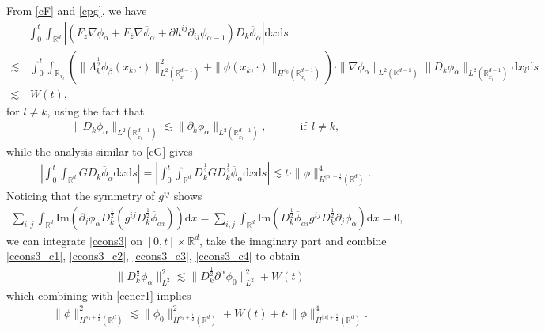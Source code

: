 \documentclass[10pt,twoside,a4paper]{article}
\numberwithin{equation}{section}\allowdisplaybreaks
\begin{document}
From \eqref{cF} and \eqref{cpg}, we have
\begin{align} \label{ccons3_c3}
	& \int_0^t \int_{\mathbb{R}^d} \left|  \left(F_z\nabla \phi_\alpha+F_{\overline{z}}\nabla \overline{\phi}_\alpha+\partial h^{ij}\partial_{ij } \phi_{\alpha -1}\right)D_k\overline{\phi}_{\alpha } \right| \mathrm{d} x \mathrm{d} s\\
	\lesssim &\,\int_0^t \int_{\mathbb{R}_{x_l}} \left(\|\Lambda_k^{\frac 12}\phi_{\beta}(x_k,\cdot)\|^2_{L^2(\mathbb{R}^{d-1}_{\hat{x}_l})}+\|\phi(x_k,\cdot)\|_{H^{s_0}(\mathbb{R}^{d-1}_{\hat{x}_l})}\right)\cdot\| \nabla \phi_{\alpha}\|_{L^2(\mathbb{R}^{d-1})}\| D_k \phi_{\alpha}\|_{L^2(\mathbb{R}^{d-1}_{\hat{x}_l})} \mathrm{d} x_l\mathrm{d}s  \nonumber\\
	\lesssim &\,W(t),\nonumber 
\end{align}
for  $  l\neq k  $,
using the fact that
\begin{align*}
	\| D_k \phi_{\alpha}\|_{L^2(\mathbb{R}^{d-1}_{\hat{x}_l})} \lesssim 	\| \partial_k \phi_{\alpha}\|_{L^2(\mathbb{R}^{d-1}_{\hat{x}_l})},\quad  \qquad\text{if}~~ l\neq k,
\end{align*}
while the  analysis  similar to \eqref{cG}  gives
\begin{align} \label{ccons3_c4}
	\left| \int_0^t \int_{\mathbb{R}^d}   G D_k\overline{\phi}_{\alpha }  \mathrm{d} x \mathrm{d} s \right|= 	\left| \int_0^t \int_{\mathbb{R}^d}   D_k^{\frac 12} G D_k^{\frac 12}\overline{\phi}_{\alpha }  \mathrm{d} x \mathrm{d} s \right|\lesssim t\cdot\|\phi\|_{H^{|\alpha|+\frac12}(\mathbb{R}^{d})}^4.
\end{align}
Noticing that the symmetry of $ g^{ij} $ shows
\begin{align*} 
	\sum_{i,j}\int_{\mathbb{R}^{d}}\mathrm{Im} \left(   \partial_j \phi_{\alpha } D_k^{\frac12}( g^{ij} D_k^{\frac12}  \overline{\phi}_{\alpha i })\right) \mathrm{d}x=\sum_{i,j}	\int_{\mathbb{R}^{d}}\mathrm{Im} \left( D_k^{\frac 12}\overline{\phi}_{\alpha i }  g^{ij} D_k^{\frac 12} \partial_j \phi_{\alpha }\right) \mathrm{d}x=0,
\end{align*}
we can integrate \eqref{ccons3} on  $  [0,t]\times\mathbb{R}^d  $, take the imaginary part and combine \eqref{ccons3_c1}, \eqref{ccons3_c2}, \eqref{ccons3_c3}, \eqref{ccons3_c4} to obtain
\begin{align*} 
	&	\| D_k^{\frac12}\phi_\alpha\|_{L^2}^2 \lesssim 	\| D_k^{\frac12}\partial^\alpha\phi_0\|_{L^2}^2+ W(t)
\end{align*}
which combining with \eqref{cener1} implies
\begin{align}\label{cener3}
	&	\|\phi\|_{H^{s_3+\frac12}(\mathbb{R}^{d})}^2\lesssim 	\|\phi_0\|_{H^{s_3+\frac12}(\mathbb{R}^{d})}^2+ W(t)+t\cdot\|\phi\|_{H^{|\alpha|+\frac12}(\mathbb{R}^{d})}^4.
\end{align}
\end{document}

